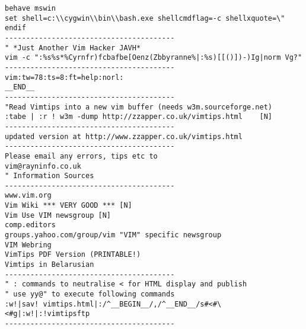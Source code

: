 \documentclass[10pt,landscape]{article}
\begin{document}
\begin{multicols}{2}
\begin{verbatim}
behave mswin
set shell=c:\\cygwin\\bin\\bash.exe shellcmdflag=-c shellxquote=\"
endif
----------------------------------------
" *Just Another Vim Hacker JAVH*
vim -c ":%s%s*%Cyrnfr)fcbafbe[Oenz(Zbbyranne%|:%s)[[()])-)Ig|norm Vg?"
----------------------------------------
vim:tw=78:ts=8:ft=help:norl:
__END__
----------------------------------------
"Read Vimtips into a new vim buffer (needs w3m.sourceforge.net)
:tabe | :r ! w3m -dump http://zzapper.co.uk/vimtips.html    [N]
----------------------------------------
updated version at http://www.zzapper.co.uk/vimtips.html
----------------------------------------
Please email any errors, tips etc to
vim@rayninfo.co.uk
" Information Sources
----------------------------------------
www.vim.org
Vim Wiki *** VERY GOOD *** [N]
Vim Use VIM newsgroup [N]
comp.editors
groups.yahoo.com/group/vim "VIM" specific newsgroup
VIM Webring
VimTips PDF Version (PRINTABLE!)
Vimtips in Belarusian 
----------------------------------------
" : commands to neutralise < for HTML display and publish
" use yy@" to execute following commands
:w!|sav! vimtips.html|:/^__BEGIN__/,/^__END__/s#<#\<#g|:w!|:!vimtipsftp
----------------------------------------
\end{verbatim}
\end{multicols}
\end{document}
